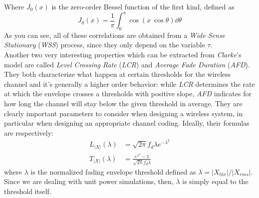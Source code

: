 %
Where $J_0(x)$ is the zero-order Bessel function of the first kind, defined as%
%
\begin{equation}
J_0(x) = \frac{1}{\pi} \int_0^\pi \cos( x \ \cos\theta) \dd{\theta}
\end{equation}%
%
As you can see, all of these correlations are obtained from a \textit{Wide Sense Stationary} (\textit{WSS}) process, since they only depend on the variable $\tau$.\\
Another two very interesting properties which can be extracted from \textit{Clarke}'s model are called \textit{Level Crossing Rate} (\textit{LCR}) and \textit{Average Fade Duration} (\textit{AFD}). They both characterize what happen at certain thresholds for the wireless channel and it's generally a higher order behavior: while \textit{LCR} determines the rate at which the envelope crosses a thresholds with positive slope, \textit{AFD} indicates for how long the channel will stay below the given threshold in average. They are clearly important parameters to consider when designing a wireless system, in particular when designing an appropriate channel coding. Ideally, their formulas are respectively:%
%
\begin{align}
L_{|X|}(\lambda) &= \sqrt{2\pi} f_d \lambda e^{-\lambda^2} \label{eq:LCR} \\
T_{|X|}(\lambda) &= \frac{e^{\lambda^2} - 1}{\sqrt{2\pi} f_d \lambda} \label{eq:AFD}
\end{align}%
%
where $\lambda$ is the normalized fading envelope threshold defined as $\lambda = |X_{thr}|/|X_{rms}|$. Since we are dealing with unit power simulations, then, $\lambda$ is simply equal to the threshold itself.

